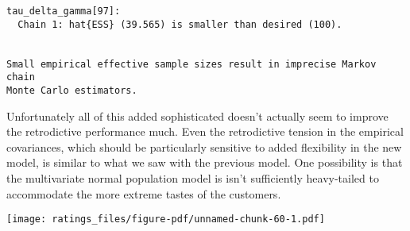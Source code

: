 \documentclass[
  letterpaper,
  DIV=11,
  numbers=noendperiod]{scrartcl}
\newenvironment{Shaded}{\begin{snugshade}}{\end{snugshade}}
\newcommand{\AttributeTok}[1]{\textcolor[rgb]{0.40,0.45,0.13}{#1}}
\newcommand{\DecValTok}[1]{\textcolor[rgb]{0.68,0.00,0.00}{#1}}
\newcommand{\FloatTok}[1]{\textcolor[rgb]{0.68,0.00,0.00}{#1}}
\newcommand{\FunctionTok}[1]{\textcolor[rgb]{0.28,0.35,0.67}{#1}}
\newcommand{\NormalTok}[1]{\textcolor[rgb]{0.00,0.23,0.31}{#1}}
\newcommand{\SpecialCharTok}[1]{\textcolor[rgb]{0.37,0.37,0.37}{#1}}
\newcommand{\StringTok}[1]{\textcolor[rgb]{0.13,0.47,0.30}{#1}}
\begin{document}
\begin{verbatim}
tau_delta_gamma[97]:
  Chain 1: hat{ESS} (39.565) is smaller than desired (100).


Small empirical effective sample sizes result in imprecise Markov chain
Monte Carlo estimators.
\end{verbatim}

Unfortunately all of this added sophisticated doesn't actually seem to
improve the retrodictive performance much. Even the retrodictive tension
in the empirical covariances, which should be particularly sensitive to
added flexibility in the new model, is similar to what we saw with the
previous model. One possibility is that the multivariate normal
population model is isn't sufficiently heavy-tailed to accommodate the
more extreme tastes of the customers.

\begin{Shaded}
\end{Shaded}

\texttt{[image: ratings\_files/figure-pdf/unnamed-chunk-60-1.pdf]}
\end{document}
